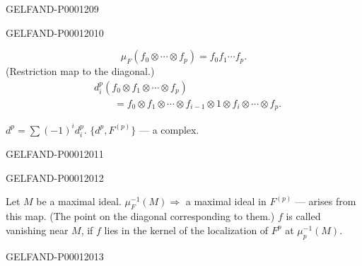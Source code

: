 \begin{GelfandAdjacentEvidence}{GELFAND-P000120}{9}

\end{GelfandAdjacentEvidence}
\begin{GelfandAdjacentEvidence}{GELFAND-P000120}{10}

\begin{equation*}\mu_F(f_0\otimes\cdots\otimes f_p)=f_0f_1\cdots f_p.\end{equation*}
(Restriction map to the diagonal.)
\begin{equation*}
\begin{aligned}
&d_i^p(f_0\otimes f_1\otimes\cdots\otimes f_p)\\
&\qquad=f_0\otimes f_1\otimes\cdots\otimes f_{i-1}\otimes1\otimes f_i\otimes\cdots\otimes f_p.
\end{aligned}
\end{equation*}

$d^p=\sum(-1)^id_i^p$.
$\{d^p,F^{(p)}\}$ — a complex.
\end{GelfandAdjacentEvidence}
\begin{GelfandAdjacentEvidence}{GELFAND-P000120}{11}


\end{GelfandAdjacentEvidence}
\begin{GelfandAdjacentEvidence}{GELFAND-P000120}{12}

Let $M$ be a maximal ideal.
$\mu_F^{-1}(M)\Rightarrow$ a maximal ideal in $F^{(p)}$ — arises from this map.
(The point on the diagonal corresponding to them.)
$f$ is called vanishing near $M$,
if $f$ lies in the kernel of the localization of $F^p$ at $\mu_p^{-1}(M)$.
\end{GelfandAdjacentEvidence}
\begin{GelfandAdjacentEvidence}{GELFAND-P000120}{13}

\end{GelfandAdjacentEvidence}
